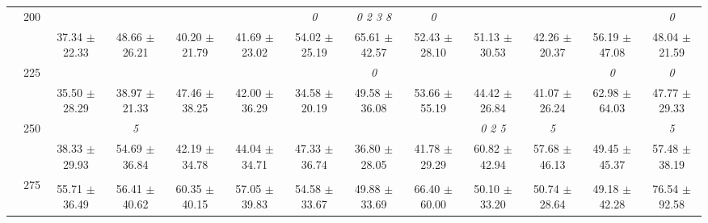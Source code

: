 \begin{table}[h]
{\begin{tabular}{
        ccccccccccccc}
 & \multirow{2}{*}{200}& & & & & \textit{ 0 }& \textit{ 0 2 3 8 }& \textit{ 0 }& & & & \textit{ 0 } \\ 
 & & 37.34 $\pm$ 22.33& 48.66 $\pm$ 26.21& 40.20 $\pm$ 21.79& 41.69 $\pm$ 23.02& 54.02 $\pm$ 25.19& 65.61 $\pm$ 42.57& 52.43 $\pm$ 28.10& 51.13 $\pm$ 30.53& 42.26 $\pm$ 20.37& 56.19 $\pm$ 47.08& 48.04 $\pm$ 21.59 \\ 
 & \multirow{2}{*}{225}& \cellcolor[HTML]{EFEFEF} & \cellcolor[HTML]{EFEFEF} & \cellcolor[HTML]{EFEFEF} & \cellcolor[HTML]{EFEFEF} & \cellcolor[HTML]{EFEFEF} & \cellcolor[HTML]{EFEFEF} \textit{ 0 }& \cellcolor[HTML]{EFEFEF} & \cellcolor[HTML]{EFEFEF} & \cellcolor[HTML]{EFEFEF} & \cellcolor[HTML]{EFEFEF} \textit{ 0 }& \cellcolor[HTML]{EFEFEF} \textit{ 0 } \\ 
 & & \cellcolor[HTML]{EFEFEF} 35.50 $\pm$ 28.29& \cellcolor[HTML]{EFEFEF} 38.97 $\pm$ 21.33& \cellcolor[HTML]{EFEFEF} 47.46 $\pm$ 38.25& \cellcolor[HTML]{EFEFEF} 42.00 $\pm$ 36.29& \cellcolor[HTML]{EFEFEF} 34.58 $\pm$ 20.19& \cellcolor[HTML]{EFEFEF} 49.58 $\pm$ 36.08& \cellcolor[HTML]{EFEFEF} 53.66 $\pm$ 55.19& \cellcolor[HTML]{EFEFEF} 44.42 $\pm$ 26.84& \cellcolor[HTML]{EFEFEF} 41.07 $\pm$ 26.24& \cellcolor[HTML]{EFEFEF} 62.98 $\pm$ 64.03& \cellcolor[HTML]{EFEFEF} 47.77 $\pm$ 29.33 \\ 
 & \multirow{2}{*}{250}& & \textit{ 5 }& & & & & & \textit{ 0 2 5 }& \textit{ 5 }& & \textit{ 5 } \\ 
 & & 38.33 $\pm$ 29.93& 54.69 $\pm$ 36.84& 42.19 $\pm$ 34.78& 44.04 $\pm$ 34.71& 47.33 $\pm$ 36.74& 36.80 $\pm$ 28.05& 41.78 $\pm$ 29.29& 60.82 $\pm$ 42.94& 57.68 $\pm$ 46.13& 49.45 $\pm$ 45.37& 57.48 $\pm$ 38.19 \\ 
 & \multirow{2}{*}{275}& \cellcolor[HTML]{EFEFEF} & \cellcolor[HTML]{EFEFEF} & \cellcolor[HTML]{EFEFEF} & \cellcolor[HTML]{EFEFEF} & \cellcolor[HTML]{EFEFEF} & \cellcolor[HTML]{EFEFEF} & \cellcolor[HTML]{EFEFEF} & \cellcolor[HTML]{EFEFEF} & \cellcolor[HTML]{EFEFEF} & \cellcolor[HTML]{EFEFEF} & \cellcolor[HTML]{EFEFEF}  \\ 
 & & \cellcolor[HTML]{EFEFEF} 55.71 $\pm$ 36.49& \cellcolor[HTML]{EFEFEF} 56.41 $\pm$ 40.62& \cellcolor[HTML]{EFEFEF} 60.35 $\pm$ 40.15& \cellcolor[HTML]{EFEFEF} 57.05 $\pm$ 39.83& \cellcolor[HTML]{EFEFEF} 54.58 $\pm$ 33.67& \cellcolor[HTML]{EFEFEF} 49.88 $\pm$ 33.69& \cellcolor[HTML]{EFEFEF} 66.40 $\pm$ 60.00& \cellcolor[HTML]{EFEFEF} 50.10 $\pm$ 33.20& \cellcolor[HTML]{EFEFEF} 50.74 $\pm$ 28.64& \cellcolor[HTML]{EFEFEF} 49.18 $\pm$ 42.28& \cellcolor[HTML]{EFEFEF} 76.54 $\pm$ 92.58 \\ 

\end{tabular}}
\end{table}
